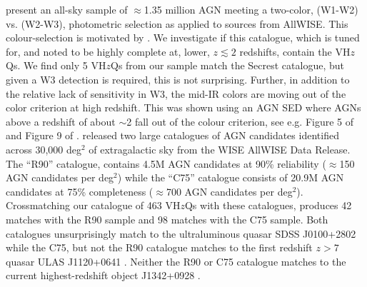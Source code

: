 \documentclass[usenatbib]{mnras}
\begin{document}
\citet{Secrest2015} present an all-sky sample of $\approx$1.35 million
AGN meeting a two-color, (W1-W2) vs. (W2-W3), photometric selection as
applied to sources from AllWISE. This colour-selection is motivated by
\citet{Mateos2012}. We investigate if this catalogue, which is tuned
for, and noted to be highly complete at, lower, $z\lesssim2$
redshifts, contain the VH$z$Qs. We find only 5 VH$z$Qs from our sample
match the Secrest catalogue, but given a W3 detection is required,
this is not surprising. Further, in addition to the relative lack of
sensitivity in W3, the mid-IR colors are moving out of the
\citet{Mateos2012} color criterion at high redshift. This was shown
using an AGN SED where AGNs above a redshift of about $\sim$2 fall out
of the colour criterion, see e.g. Figure 5 of \citet[][]{Mateos2012}
and Figure 9 of \citet{Secrest2015}.
\citet{Assef2018} released two large catalogues of AGN
candidates identified across 30,000 deg$^2$ of extragalactic sky from
the WISE AllWISE Data Release. The ``R90'' catalogue, contains 4.5M
AGN candidates at 90\% reliability ($\approx$150 AGN candidates
per deg$^2$) while the ``C75'' catalogue consists of 20.9M AGN
candidates at 75\% completeness ($\approx$700 AGN candidates per
deg$^2$). Crossmatching our catalogue of 463 VH$z$Qs with these
catalogues, produces 42 matches with the R90 sample and 98 matches
with the C75 sample. Both catalogues unsurprisingly match to the
ultraluminous quasar SDSS J0100+2802 \citep{Wu2015} while the C75, but
not the R90 catalogue matches to the first redshift $z>7$ quasar ULAS
J1120+0641 \citep{Mortlock2011}. Neither the R90 or C75 catalogue matches to the
current highest-redshift object J1342+0928 \citep{Banados2018}.
\end{document}
